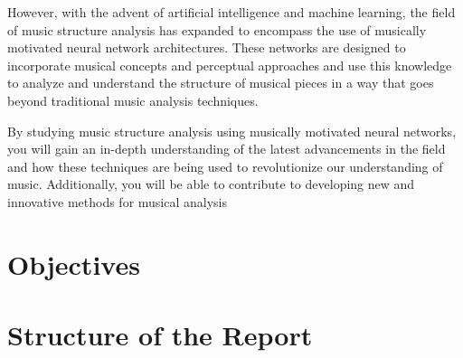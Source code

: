 However, with the advent of artificial intelligence and machine learning, the field of music structure analysis has expanded to encompass the use of musically motivated neural network architectures. These networks are designed to incorporate musical concepts and perceptual approaches and use this knowledge to analyze and understand the structure of musical pieces in a way that goes beyond traditional music analysis techniques.

By studying music structure analysis using musically motivated neural networks, you will gain an in-depth understanding of the latest advancements in the field and how these techniques are being used to revolutionize our understanding of music. Additionally, you will be able to contribute to developing new and innovative methods for musical analysis~\cite{Huang2019MusicTG}

\section{Objectives}

\section{Structure of the Report}


\newpage


